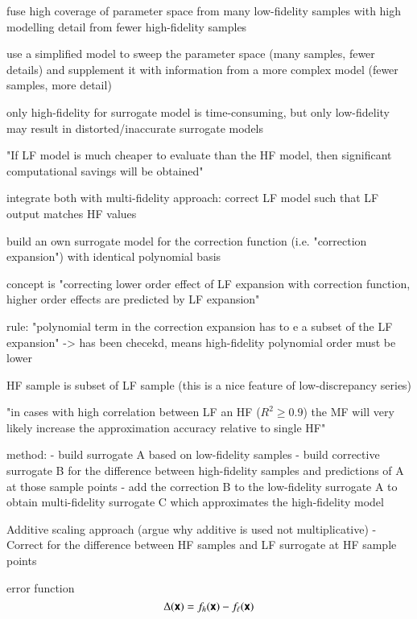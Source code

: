 \cite{palar_multi-fidelity_2016}
\cite{ng_multifidelity_2012}
\cite{berchier_multi-fidelity_nodate}

fuse high coverage of parameter space from many low-fidelity samples with
high modelling detail from fewer high-fidelity samples

use a simplified model to sweep the parameter space (many samples, fewer details)
and supplement it with information from a more complex model (fewer samples, more detail)

only high-fidelity for surrogate model is time-consuming,
but only low-fidelity may result in distorted/inaccurate surrogate models

"If LF model is much cheaper to evaluate than the HF model, then significant
computational savings will be obtained" \cite{ng_multifidelity_2012}

integrate both with multi-fidelity approach: correct LF model such that LF output matches HF values

build an own surrogate model for the correction function (i.e. "correction expansion") with identical polynomial basis

concept is "correcting lower order effect of LF expansion with correction function, higher order effects are predicted by LF expansion" \cite{palar_multi-fidelity_2016}

rule: "polynomial term in the correction expansion has to e a subset of the LF expansion" \cite{palar_multi-fidelity_2016}
-> has been checekd, means high-fidelity polynomial order must be lower 

HF sample is subset of LF sample (this is a nice feature of low-discrepancy series)

"in cases with high correlation between LF an HF ($R^2 \geq 0.9$) the MF will very likely increase the approximation accuracy relative to single HF" \cite{palar_multi-fidelity_2016}

method:
- build surrogate A based on low-fidelity samples
- build corrective surrogate B for the difference between high-fidelity samples and predictions of A at those sample points
- add the correction B to the low-fidelity surrogate A to obtain multi-fidelity surrogate C which approximates the high-fidelity model

Additive scaling approach (argue why additive is used not multiplicative)
- Correct for the difference between HF samples and LF surrogate at HF sample points

error function
\begin{equation}
    \Delta(\boldsymbol{\mathsf{x}}) = f_h(\boldsymbol{\mathsf{x}}) - f_\ell(\boldsymbol{\mathsf{x}})
\end{equation}


